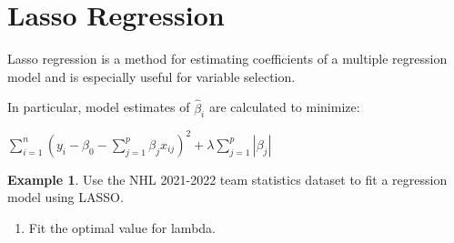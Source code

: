 \documentclass[
  11pt,
]{book}
\newenvironment{Shaded}{\begin{snugshade}}{\end{snugshade}}
\newcommand{\AttributeTok}[1]{\textcolor[rgb]{0.77,0.63,0.00}{#1}}
\newcommand{\CommentTok}[1]{\textcolor[rgb]{0.56,0.35,0.01}{\textit{#1}}}
\newcommand{\DecValTok}[1]{\textcolor[rgb]{0.00,0.00,0.81}{#1}}
\newcommand{\FunctionTok}[1]{\textcolor[rgb]{0.00,0.00,0.00}{#1}}
\newcommand{\NormalTok}[1]{#1}
\newcommand{\OtherTok}[1]{\textcolor[rgb]{0.56,0.35,0.01}{#1}}
\newcommand{\SpecialCharTok}[1]{\textcolor[rgb]{0.00,0.00,0.00}{#1}}
\providecommand{\tightlist}{%
  \setlength{\itemsep}{0pt}\setlength{\parskip}{0pt}}
\theoremstyle{definition}
\theoremstyle{definition}
\newtheorem{example}{Example}[chapter]
\theoremstyle{definition}
\theoremstyle{definition}
\theoremstyle{remark}
\begin{document}
\newpage

\hypertarget{lasso-regression}{%
\section{Lasso Regression}\label{lasso-regression}}

Lasso regression is a method for estimating coefficients of a multiple regression model and is especially useful for variable selection.

In particular, model estimates of \(\hat{\beta}_i\) are calculated to minimize:

\(\sum_{i=1}^n (y_i - \beta_0 - \sum_{j=1}^p \beta_j x_{ij})^2 + \lambda \sum_{j=1}^p |\beta_j|\)

\begin{example}
Use the NHL 2021-2022 team statistics dataset to fit a regression model using LASSO.
\end{example}

\begin{enumerate}
\def\labelenumi{(\alph{enumi})}
\tightlist
\item
  Fit the optimal value for lambda.
\end{enumerate}

\begin{Shaded}
\end{Shaded}
\end{document}
